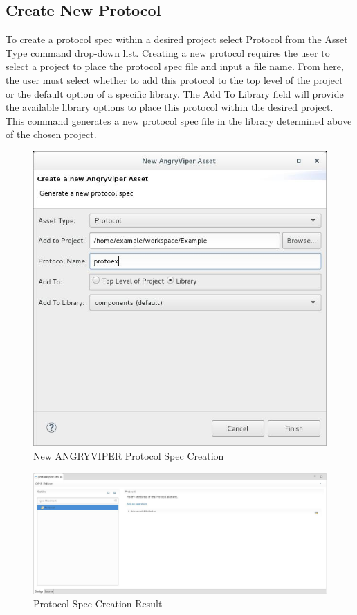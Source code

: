 \newpage

\subsection{Create New Protocol}
\label{sec:create_protocol}
\begin{flushleft}

To create a protocol spec within a desired project select Protocol from the Asset Type command drop-down list. Creating a new protocol requires the user to select a project to place the protocol spec file and input a file name. From here, the user must select whether to add this protocol to the top level of the project or the default option of a specific library. The Add To Library field will provide the available library options to place this protocol within the desired project. This command generates a new protocol spec file in the library determined above of the chosen project.\newline
\begin{figure}[h!]
  \centering
  \includegraphics[scale=0.45]{figures/createprotocol.jpg}
  \caption{New ANGRYVIPER Protocol Spec Creation}
  \label{fig:figure8}
\end{figure}

\begin{figure}[h!]
  \centering
  \includegraphics[scale=0.31]{figures/protocolresult.jpg}
  \caption{Protocol Spec Creation Result}
  \label{fig:figure9}
\end{figure}


\end{flushleft}
